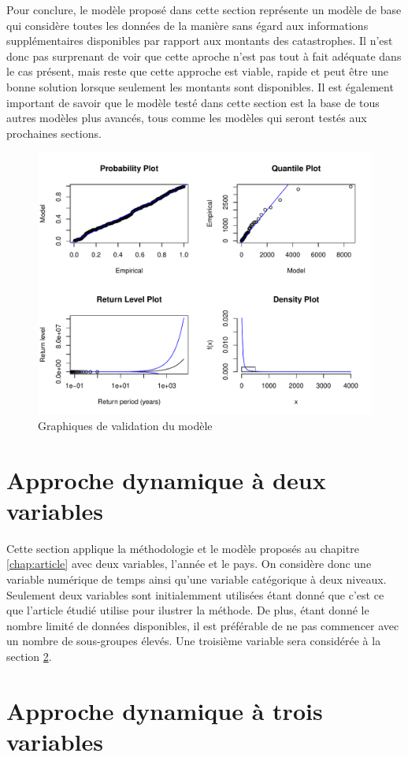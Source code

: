 Pour conclure, le modèle proposé dans cette section représente un modèle de base qui considère toutes les données de la manière sans égard aux informations supplémentaires disponibles par rapport aux montants des catastrophes. Il n'est donc pas surprenant de voir que cette aproche n'est pas tout à fait adéquate dans le cas présent, mais reste que cette approche est viable, rapide et peut être une bonne solution lorsque seulement les montants sont disponibles. Il est également important de savoir que le modèle testé dans cette section est la base de tous autres modèles plus avancés, tous comme les modèles qui seront testés aux prochaines sections.
\begin{figure}[h]
\begin{center}
\includegraphics{images/fig-011}
\end{center}
\caption{Graphiques de validation du modèle}
\label{fig:3.6}
\end{figure}


\clearpage
\section{Approche dynamique à deux variables}
\label{sec:3.3}

Cette section applique la méthodologie et le modèle proposés au chapitre \ref{chap:article} avec deux variables, l'année et le pays. On considère donc une variable numérique de temps ainsi qu'une variable catégorique à deux niveaux. Seulement deux variables sont initialemment utilisées étant donné que c'est ce que l'article étudié utilise pour ilustrer la méthode. De plus, étant donné le nombre limité de données disponibles, il est préférable de ne pas commencer avec un nombre de sous-groupes élevés. Une troisième variable sera considérée à la section \ref{sec:3.4}.




\clearpage
\section{Approche dynamique à trois variables}
\label{sec:3.4}
